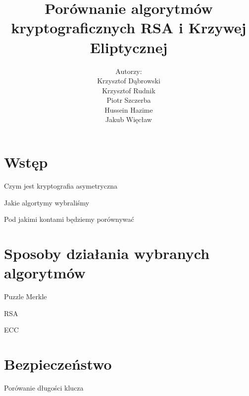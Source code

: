 \documentclass{beamer}
\title{Porównanie algorytmów kryptograficznych RSA i Krzywej Eliptycznej}
\author{Autorzy:\\ Krzysztof Dąbrowski\\ Krzysztof Rudnik\\ Piotr Szczerba\\ Hussein Hazime\\ Jakub Więcław}
\date{}
\begin{document}
\begin{frame}
    \titlepage
\end{frame}

\section{Wstęp}
\begin{frame}{Czym jest kryptografia asymetryczna}
\end{frame}

\begin{frame}{Jakie algortymy wybraliśmy}
    
\end{frame}
\begin{frame}{Pod jakimi kontami będziemy porównywać}
    
\end{frame}

\section{Sposoby działania wybranych algorytmów}
\begin{frame}{Puzzle Merkle} %
    
\end{frame}


\begin{frame}{RSA}
    
\end{frame}



\begin{frame}{ECC}
    
\end{frame}




\section{Bezpieczeństwo}

\begin{frame}{Porówanie długości klucza}
\end{frame}
\end{document}
